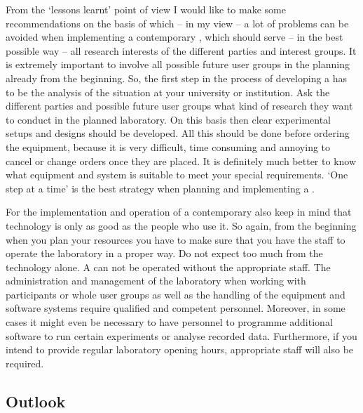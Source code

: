 \documentclass[output=paper]{langsci/langscibook}
\begin{document}
From the `lessons learnt' point of view I would like to make some recommendations on the basis of which -- in my view -- a lot of problems can be avoided when implementing a contemporary , which should serve -- in the best possible way -- all research interests of the different parties and interest groups. It is extremely important to involve all possible future user groups in the planning already from the beginning. So, the first step in the process of developing a  has to be the analysis of the situation at your university or institution. Ask the different parties and possible future user groups what kind of research they want to conduct in the planned laboratory. On this basis then clear experimental setups and designs should be developed. All this should be done before ordering the equipment, because it is very difficult, time consuming and annoying to cancel or change orders once they are placed. It is definitely much better to know what equipment and system is suitable to meet your special requirements. `One step at a time' is the best strategy when planning and implementing a .


For the implementation and operation of a contemporary  also keep in mind that technology is only as good as the people who use it. So again, from the beginning when you plan your resources you have to make sure that you have the staff to operate the laboratory in a proper way. Do not expect too much from the technology alone. A  can not be operated without the appropriate staff. The administration and management of the laboratory when working with participants or whole user groups as well as the handling of the equipment and software systems require qualified and competent personnel. Moreover, in some cases it might even be necessary to have personnel to programme additional software to run certain experiments or analyse recorded data. Furthermore, if you intend to provide regular laboratory opening hours, appropriate staff will also be required. 


\subsection{Outlook}
\end{document}
